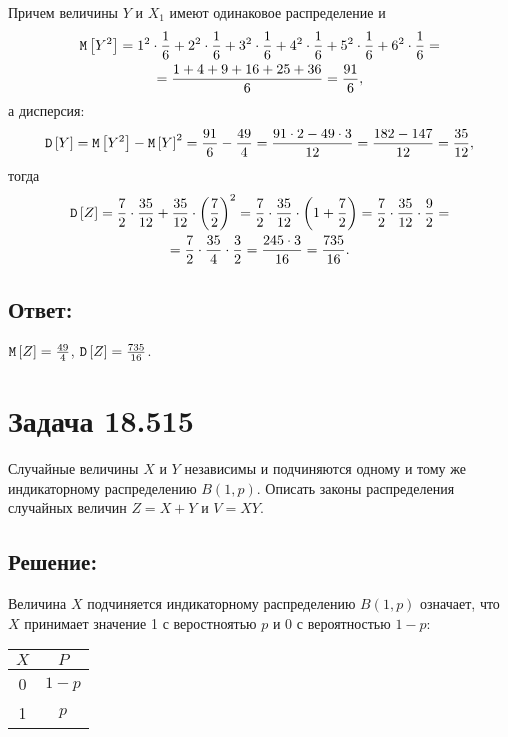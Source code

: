 Причем величины $Y$ и $X_1$ имеют одинаковое распределение и
\begin{multline}
    \mathtt{M} \left [ Y^2 \right ]
    = 1^2 \cdot \frac{1}{6} + 2^2 \cdot \frac{1}{6} + 3^2 \cdot \frac{1}{6} + 4^2 \cdot \frac{1}{6} + 5^2 \cdot \frac{1}{6} + 6^2 \cdot \frac{1}{6} = \\
    = \frac{1 + 4 + 9 + 16 + 25 + 36}{6}
    = \frac{91}{6},
\end{multline}
а дисперсия:
\begin{equation}
    \mathtt{D} \left [ Y \right ]
    = \mathtt{M} \left [ Y^2 \right ] - \mathtt{M} \left [ Y \right ]^2
    = \frac{91}{6} - \frac{49}{4}
    = \frac{91 \cdot 2 - 49 \cdot 3}{12}
    = \frac{182 - 147}{12}
    = \frac{35}{12},
\end{equation}
тогда
\begin{multline}
    \mathtt{D} \left [ Z \right ]
    = \frac{7}{2} \cdot \frac{35}{12} + \frac{35}{12} \cdot \left ( \frac{7}{2} \right )^2
    = \frac{7}{2} \cdot \frac{35}{12} \cdot \left ( 1 + \frac{7}{2} \right )
    = \frac{7}{2} \cdot \frac{35}{12} \cdot \frac{9}{2} = \\
    = \frac{7}{2} \cdot \frac{35}{4} \cdot \frac{3}{2}
    = \frac{245 \cdot 3}{16}
    = \frac{735}{16}.
\end{multline}

\subsection*{Ответ:}
$\mathtt{M} \left [ Z \right ] = \frac{49}{4}$, $\mathtt{D} \left [ Z \right ] = \frac{735}{16}$.

\section*{Задача 18.515}

Случайные величины $X$ и $Y$ независимы и подчиняются одному и тому же индикаторному распределению $B(1,p)$. Описать законы распределения случайных величин
$Z = X + Y$ и $V = X Y$.
\subsection*{Решение:}
Величина $X$ подчиняется индикаторному распределению $B(1,p)$ означает, что $X$ принимает значение 1 с веростноятью $p$ и 0 с вероятностью $1-p$:

\begin{tabular}{|c|c|}
    \hline
    $X$ & $P$   \\
    \hline
    0   & $1-p$ \\
    \hline
    1   & $p$   \\
    \hline
\end{tabular}

